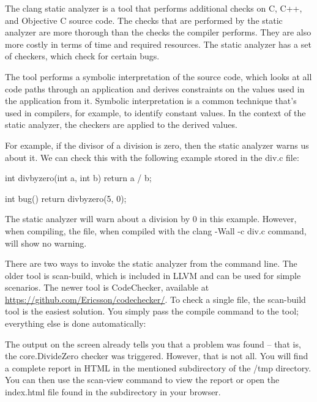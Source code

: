 
The clang static analyzer is a tool that performs additional checks on C, C++, and Objective C source code. The checks that are performed by the static analyzer are more thorough than the checks the compiler performs. They are also more costly in terms of time and required resources. The static analyzer has a set of checkers, which check for certain bugs.

The tool performs a symbolic interpretation of the source code, which looks at all code paths through an application and derives constraints on the values used in the application from it. Symbolic interpretation is a common technique that’s used in compilers, for example, to identify constant values. In the context of the static analyzer, the checkers are applied to the derived values.

For example, if the divisor of a division is zero, then the static analyzer warns us about it. We can check this with the following example stored in the div.c file:

\begin{cpp}
int divbyzero(int a, int b) { return a / b; }

int bug() { return divbyzero(5, 0); }
\end{cpp}

The static analyzer will warn about a division by 0 in this example. However, when compiling, the file, when compiled with the clang -Wall -c div.c command, will show no warning.

There are two ways to invoke the static analyzer from the command line. The older tool is scan-build, which is included in LLVM and can be used for simple scenarios. The newer tool is CodeChecker, available at \url{https://github.com/Ericsson/codechecker/}. To check a single file, the scan-build tool is the easiest solution. You simply pass the compile command to the tool; everything else is done automatically:


The output on the screen already tells you that a problem was found – that is, the core.DivideZero checker was triggered. However, that is not all. You will find a complete report in HTML in the mentioned subdirectory of the /tmp directory. You can then use the scan-view command to view the report or open the index.html file found in the subdirectory in your browser.

